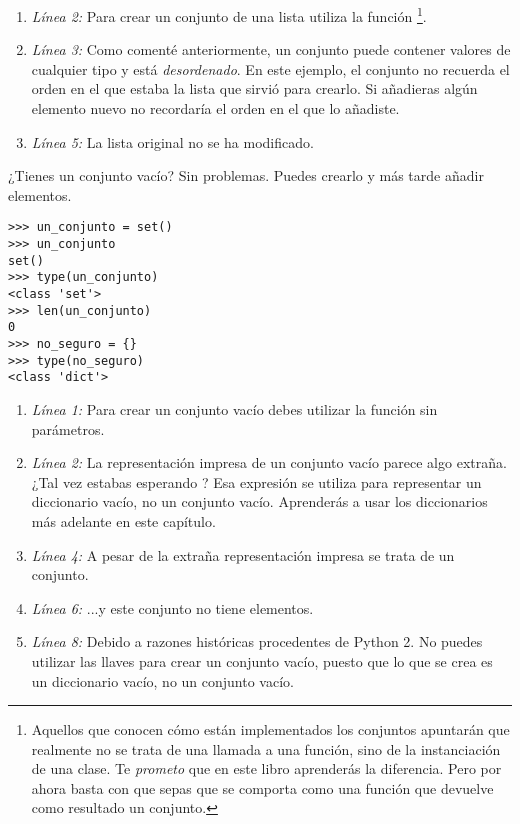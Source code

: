 \begin{enumerate}

\item \emph{Línea 2:} Para crear un conjunto de una lista utiliza la función \footnote{Aquellos que conocen cómo están implementados los conjuntos apuntarán que realmente no se trata de una llamada a una función, sino de la instanciación de una clase. Te \emph{prometo} que en este libro aprenderás la diferencia. Pero por ahora basta con que sepas que  se comporta como una función que devuelve como resultado un conjunto.}.

\item \emph{Línea 3:} Como comenté anteriormente, un conjunto puede contener valores de cualquier tipo y está \emph{desordenado}. En este ejemplo, el conjunto no recuerda el orden en el que estaba la lista que sirvió para crearlo. Si añadieras algún elemento nuevo no recordaría el orden en el que lo añadiste.

\item \emph{Línea 5:} La lista original no se ha modificado.

\end{enumerate}

¿Tienes un conjunto vacío? Sin problemas. Puedes crearlo y más tarde añadir elementos.

\noindent\begin{minipage}{\textwidth}
\begin{lstlisting}[mathescape=True]
>>> un_conjunto = set()
>>> un_conjunto
set()
>>> type(un_conjunto)
<class 'set'>
>>> len(un_conjunto)
0
>>> no_seguro = {}
>>> type(no_seguro)
<class 'dict'>
\end{lstlisting}
\end{minipage}

\begin{enumerate}

\item \emph{Línea 1:} Para crear un conjunto vacío debes utilizar la función  sin parámetros.

\item \emph{Línea 2:} La representación impresa de un conjunto vacío parece algo extraña. ¿Tal vez estabas esperando \codigo{\{\}}? Esa expresión se utiliza para representar un diccionario vacío, no un conjunto vacío. Aprenderás a usar los diccionarios más adelante en este capítulo.

\item \emph{Línea 4:} A pesar de la extraña representación impresa se trata de un conjunto.

\item \emph{Línea 6:} ...y este conjunto no tiene elementos.

\item \emph{Línea 8:} Debido a razones históricas procedentes de Python 2. No puedes utilizar las llaves para crear un conjunto vacío, puesto que lo que se crea es un diccionario vacío, no un conjunto vacío.

\end{enumerate}

